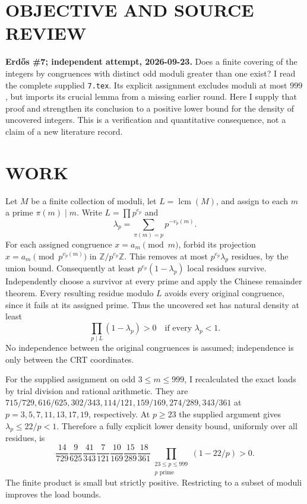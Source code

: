 \section{OBJECTIVE AND SOURCE REVIEW}
\textbf{Erd\H{o}s \#7; independent attempt, 2026-09-23.}
Does a finite covering of the integers by congruences with distinct odd moduli greater than one exist? I read the complete supplied \texttt{7.tex}. Its explicit assignment excludes moduli at most $999$, but imports its crucial lemma from a missing earlier round. Here I supply that proof and strengthen its conclusion to a positive lower bound for the density of uncovered integers. This is a verification and quantitative consequence, not a claim of a new literature record.

\section{WORK}
Let $M$ be a finite collection of moduli, let $L=\operatorname{lcm}(M)$, and assign to each $m$ a prime $\pi(m)\mid m$. Write $L=\prod p^{e_p}$ and
\[
\lambda_p=\sum_{\pi(m)=p}p^{-v_p(m)}.
\]
For each assigned congruence $x=a_m\pmod m$, forbid its projection $x=a_m\pmod {p^{v_p(m)}}$ in $\mathbb Z/p^{e_p}\mathbb Z$. This removes at most $p^{e_p}\lambda_p$ residues, by the union bound. Consequently at least $p^{e_p}(1-\lambda_p)$ local residues survive. Independently choose a survivor at every prime and apply the Chinese remainder theorem. Every resulting residue modulo $L$ avoids every original congruence, since it fails at its assigned prime. Thus the uncovered set has natural density at least
\[
\prod_{p\mid L}(1-\lambda_p)>0
\quad\text{if every }\lambda_p<1.
\]
No independence between the original congruences is assumed; independence is only between the CRT coordinates.

For the supplied assignment on odd $3\le m\le999$, I recalculated the exact loads by trial division and rational arithmetic. They are $715/729,616/625,302/343,114/121,159/169,274/289,343/361$ at $p=3,5,7,11,13,17,19$, respectively. At $p\ge23$ the supplied argument gives $\lambda_p\le22/p<1$. Therefore a fully explicit lower density bound, uniformly over all residues, is
\[
\frac{14}{729}\frac9{625}\frac{41}{343}\frac7{121}
\frac{10}{169}\frac{15}{289}\frac{18}{361}
\prod_{\substack{23\le p\le999\\p\text{ prime}}}(1-22/p)>0.
\]
The finite product is small but strictly positive. Restricting to a subset of moduli improves the load bounds.

